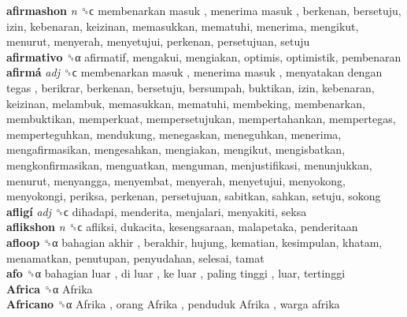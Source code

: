 \textbf{afirmashon} \emph{n}  ␝ϲ   membenarkan masuk ,  menerima masuk , berkenan, bersetuju, izin, kebenaran, keizinan, memasukkan, mematuhi, menerima, mengikut, menurut, menyerah, menyetujui, perkenan, persetujuan, setuju  \\
\textbf{afirmativo} ␝α  afirmatif, mengakui, mengiakan, optimis, optimistik, pembenaran  \\
\textbf{afirmá} \emph{adj}  ␝ϲ   membenarkan masuk ,  menerima masuk ,  menyatakan dengan tegas , berikrar, berkenan, bersetuju, bersumpah, buktikan, izin, kebenaran, keizinan, melambuk, memasukkan, mematuhi, membeking, membenarkan, membuktikan, memperkuat, mempersetujukan, mempertahankan, mempertegas, memperteguhkan, mendukung, menegaskan, meneguhkan, menerima, mengafirmasikan, mengesahkan, mengiakan, mengikut, mengisbatkan, mengkonfirmasikan, menguatkan, menguman, menjustifikasi, menunjukkan, menurut, menyangga, menyembat, menyerah, menyetujui, menyokong, menyokongi, periksa, perkenan, persetujuan, sabitkan, sahkan, setuju, sokong  \\
\textbf{afligí} \emph{adj}  ␝ϲ  dihadapi, menderita, menjalari, menyakiti, seksa  \\
\textbf{aflikshon} \emph{n}  ␝ϲ  afliksi, dukacita, kesengsaraan, malapetaka, penderitaan  \\
\textbf{afloop} ␝α   bahagian akhir , berakhir, hujung, kematian, kesimpulan, khatam, menamatkan, penutupan, penyudahan, selesai, tamat  \\
\textbf{afo} ␝α   bahagian luar ,  di luar ,  ke luar ,  paling tinggi , luar, tertinggi  \\
\textbf{Africa} ␝α   Afrika   \\
\textbf{Africano} ␝α   Afrika ,  orang Afrika ,  penduduk Afrika ,  warga afrika   \\
